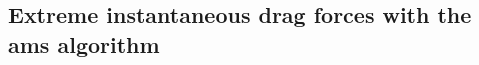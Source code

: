 \documentclass{jfm}
\newcommand{\EL}[1]{{\color{myred}{#1}}}
\begin{document}
\subsection{Extreme instantaneous drag forces with the \acl{ams} algorithm}
\label{sec:ams}

\end{document}
